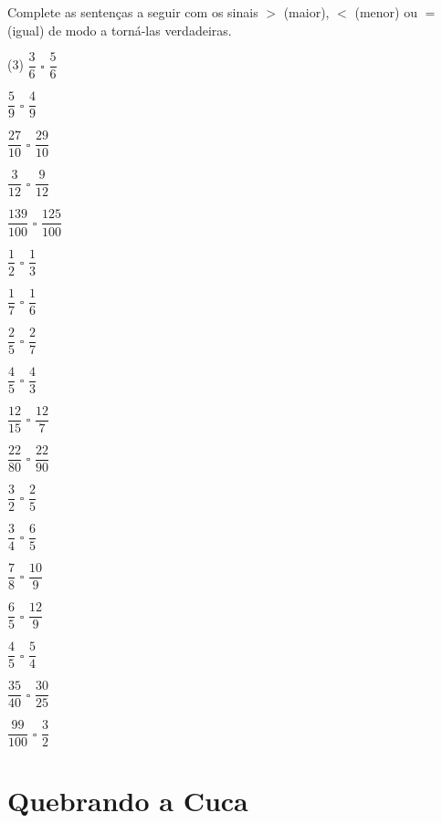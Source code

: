 \begin{atividade}{}\label{chap3-ativ16}


Complete as sentenças a seguir com os sinais $>$ (maior), $<$ (menor) ou $=$ (igual) de modo a torná-las verdadeiras.
\newcommand{\bsquare}{$\huge { }$\square$\normalsize{ }$}


\begin{tasks}[label-width=18pt, item-indent=23pt](3)
\task $\dfrac{3}{6} \bsquare \dfrac{5}{6}$

\task $\dfrac{5}{9} \bsquare \dfrac{4}{9}$

\task $\dfrac{27}{10} \bsquare \dfrac{29}{10}$

\task $\dfrac{3}{12} \bsquare \dfrac{9}{12}$

\task $\dfrac{139}{100} \bsquare \dfrac{125}{100}$

\task $\dfrac{1}{2} \bsquare \dfrac{1}{3}$

\task $\dfrac{1}{7} \bsquare \dfrac{1}{6}$

\task $\dfrac{2}{5} \bsquare \dfrac{2}{7}$

\task $\dfrac{4}{5} \bsquare \dfrac{4}{3}$

\task $\dfrac{12}{15} \bsquare \dfrac{12}{7}$

\task $\dfrac{22}{80} \bsquare \dfrac{22}{90}$

\setcounter{task}{12}

\task $\dfrac{3}{2} \bsquare \dfrac{2}{5}$

\task $\dfrac{3}{4} \bsquare \dfrac{6}{5}$

\task $\dfrac{7}{8} \bsquare \dfrac{10}{9}$

\task $\dfrac{6}{5} \bsquare \dfrac{12}{9}$

\task $\dfrac{4}{5} \bsquare \dfrac{5}{4}$

\task $\dfrac{35}{40} \bsquare \dfrac{30}{25}$

\task $\dfrac{99}{100} \bsquare \dfrac{3}{2}$
\end{tasks}

\end{atividade}
\section{Quebrando a Cuca}


